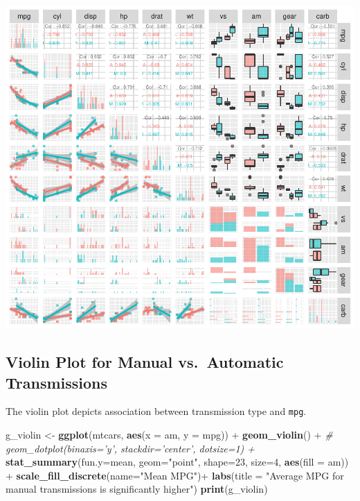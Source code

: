 \documentclass[]{article}
\newenvironment{Shaded}{\begin{snugshade}}{\end{snugshade}}
\newcommand{\KeywordTok}[1]{\textcolor[rgb]{0.13,0.29,0.53}{\textbf{{#1}}}}
\newcommand{\DataTypeTok}[1]{\textcolor[rgb]{0.13,0.29,0.53}{{#1}}}
\newcommand{\DecValTok}[1]{\textcolor[rgb]{0.00,0.00,0.81}{{#1}}}
\newcommand{\StringTok}[1]{\textcolor[rgb]{0.31,0.60,0.02}{{#1}}}
\newcommand{\CommentTok}[1]{\textcolor[rgb]{0.56,0.35,0.01}{\textit{{#1}}}}
\newcommand{\NormalTok}[1]{{#1}}
\let\origfigure\figure
\let\endorigfigure\endfigure
\renewenvironment{figure}[1][2] {
    \expandafter\origfigure\expandafter[H]
} {
    \endorigfigure
}
\begin{document}
\begin{figure}[htbp]
\centering
\includegraphics{Regression_Models_Course_Project_files/figure-latex/pairs_plot-1.pdf}
\caption{Pairs Plot of Motor Trend Cars Dataset}
\end{figure}

\subsection{Violin Plot for Manual vs.~Automatic
Transmissions}\label{violin-plot-for-manual-vs.automatic-transmissions}

The violin plot depicts association between transmission type and
\texttt{mpg}.

\begin{Shaded}
\begin{Highlighting}[]
\NormalTok{g_violin <-}\StringTok{ }\KeywordTok{ggplot}\NormalTok{(mtcars, }\KeywordTok{aes}\NormalTok{(}\DataTypeTok{x =} \NormalTok{am, }\DataTypeTok{y =} \NormalTok{mpg)) +}\StringTok{  }
\StringTok{            }\KeywordTok{geom_violin}\NormalTok{() +}
\StringTok{            }\CommentTok{# geom_dotplot(binaxis='y', stackdir='center', dotsize=1) +}
\StringTok{            }\KeywordTok{stat_summary}\NormalTok{(}\DataTypeTok{fun.y=}\NormalTok{mean, }\DataTypeTok{geom=}\StringTok{"point"}\NormalTok{, }\DataTypeTok{shape=}\DecValTok{23}\NormalTok{, }\DataTypeTok{size=}\DecValTok{4}\NormalTok{, }\KeywordTok{aes}\NormalTok{(}\DataTypeTok{fill =} \NormalTok{am)) +}
\StringTok{            }\KeywordTok{scale_fill_discrete}\NormalTok{(}\DataTypeTok{name=}\StringTok{"Mean MPG"}\NormalTok{)+}
\StringTok{            }\KeywordTok{labs}\NormalTok{(}\DataTypeTok{title =} \StringTok{"Average MPG for manual transmissions is significantly higher"}\NormalTok{)}
\KeywordTok{print}\NormalTok{(g_violin)}
\end{Highlighting}
\end{Shaded}
\end{document}
